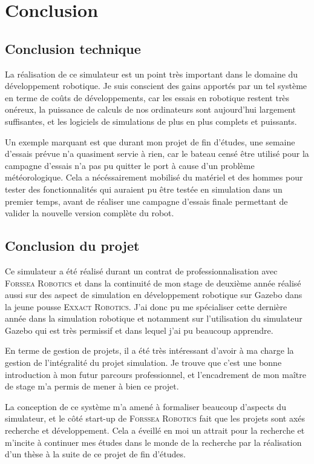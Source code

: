 \chapter{Conclusion}
	\label{chapitre:conclusion}
	
	\section{Conclusion technique}

		La réalisation de ce simulateur est un point très important dans le domaine du développement robotique. Je suis conscient des gains apportés par un tel système en terme de coûts de développements, car les essais en robotique restent très onéreux, la puissance de calculs de nos ordinateurs sont aujourd'hui largement suffisantes, et les logiciels de simulations de plus en plus complets et puissants. 
		
		Un exemple marquant est que durant mon projet de fin d'études, une semaine d'essais prévue n'a quasiment servie à rien, car le bateau censé être utilisé pour la campagne d'essais n'a pas pu quitter le port à cause d'un problème météorologique. Cela a nécéssairement mobilisé du matériel et des hommes pour tester des fonctionnalités qui auraient pu être testée en simulation dans un premier temps, avant de réaliser une campagne d'essais finale permettant de valider la nouvelle version complète du robot.
	
	\section{Conclusion du projet}

		Ce simulateur a été réalisé durant un contrat de professionnalisation avec \textsc{Forssea Robotics} et dans la continuité de mon stage de deuxième année réalisé aussi sur des aspect de simulation en développement robotique sur \gls{Gazebo} dans la jeune pousse \textsc{Exxact Robotics}. J'ai donc pu me spécialiser cette dernière année dans la simulation robotique et notamment sur l'utilisation du simulateur \gls{Gazebo} qui est très permissif et dans lequel j'ai pu beaucoup apprendre.

		En terme de gestion de projets, il a été très intéressant d'avoir à ma charge la gestion de l'intégralité du projet simulation. Je trouve que c'est une bonne introduction à mon futur parcours professionnel, et l'encadrement de mon maître de stage m'a permis de mener à bien ce projet.

		La conception de ce système m'a amené à formaliser beaucoup d'aspects du simulateur, et le côté start-up de \textsc{Forssea Robotics} fait que les projets sont axés recherche et développement. Cela a éveillé en moi un attrait pour la recherche et m'incite à continuer mes études dans le monde de la recherche par la réalisation d'un thèse à la suite de ce projet de fin d'études.